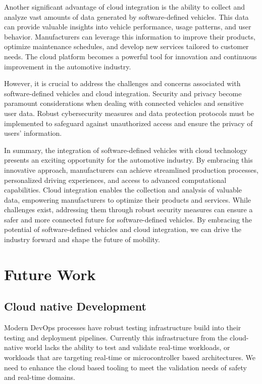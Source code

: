 \documentclass[
12pt,
oneside, 
onehalfspacing, 
nolistspacing, 
parskip, 
chapterinoneline, 
]{AASTCOMPUTER}
\begin{document}
Another significant advantage of cloud integration is the ability to collect and analyze vast amounts of data generated by software-defined vehicles. This data can provide valuable insights into vehicle performance, usage patterns, and user behavior. Manufacturers can leverage this information to improve their products, optimize maintenance schedules, and develop new services tailored to customer needs. The cloud platform becomes a powerful tool for innovation and continuous improvement in the automotive industry.

However, it is crucial to address the challenges and concerns associated with software-defined vehicles and cloud integration. Security and privacy become paramount considerations when dealing with connected vehicles and sensitive user data. Robust cybersecurity measures and data protection protocols must be implemented to safeguard against unauthorized access and ensure the privacy of users' information.

In summary, the integration of software-defined vehicles with cloud technology presents an exciting opportunity for the automotive industry. By embracing this innovative approach, manufacturers can achieve streamlined production processes, personalized driving experiences, and access to advanced computational capabilities. Cloud integration enables the collection and analysis of valuable data, empowering manufacturers to optimize their products and services. While challenges exist, addressing them through robust security measures can ensure a safer and more connected future for software-defined vehicles. By embracing the potential of software-defined vehicles and cloud integration, we can drive the industry forward and shape the future of mobility.

\section{Future Work}
\subsection{Cloud native Development}
Modern DevOps processes have robust testing infrastructure build into their testing and deployment pipelines. Currently this infrastructure from the cloud-native world lacks the ability to test and validate real-time workloads, or workloads that are targeting real-time or microcontroller based architectures. We need to enhance the cloud based tooling to meet the validation needs of safety and real-time domains.
\end{document}
